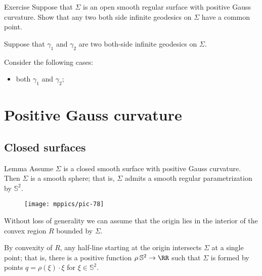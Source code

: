 \begin{thm}{Exercise}\label{ex:cohn-vossen}
Suppose that $\Sigma$ is an open smooth regular surface with positive Gauss curvature.
Show that any two both side infinite geodesics on $\Sigma$ have a common point.
\end{thm}

Suppose that $\gamma_1$ and $\gamma_2$ are two both-side infinite geodesics on $\Sigma$.

Consider the following cases:
\begin{itemize}
 \item both $\gamma_1$ and $\gamma_2$;
\end{itemize}




















\chapter{Positive Gauss curvature}




\section*{Closed surfaces}

\begin{thm}{Lemma}\label{lem:gauss=sphere}
Assume $\Sigma$ is a closed smooth surface with positive Gauss curvature.
Then $\Sigma$ is a smooth sphere; that is, $\Sigma$ admits a smooth regular parametrization by $\mathbb{S}^2$.
\end{thm}

\begin{wrapfigure}{O}{33 mm}
\vskip-0mm
\centering
\texttt{[image: mppics/pic-78]}
\vskip-0mm
\end{wrapfigure}

Without loss of generality we can assume that the origin lies in the interior of the convex region $R$ bounded by $\Sigma$.

By convexity of $R$, any half-line starting at the origin intersects $\Sigma$ at a single point;
that is, there is a positive function $\rho\:\mathbb{S}^2\to\RR$ such that $\Sigma$ is formed by points $q=\rho(\xi)\cdot \xi$ for $\xi\in \mathbb{S}^2$.

